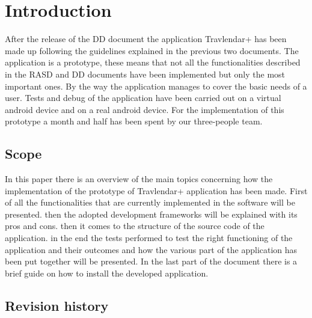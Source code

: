 \chapter{Introduction}
After the release of the DD document the application Travlendar+ has been made up following the guidelines explained in the previous two documents. The application is a prototype, these means that not all the functionalities described in the RASD and DD documents have been implemented but only the most important ones. By the way the application manages to cover the basic needs of a user. Tests and debug of the application have been carried out on a virtual android device and on a real android device. For the implementation of this prototype a month and half has been spent by our three-people team.

\section{Scope}
In this paper there is an overview of the main topics concerning how the implementation of the prototype of Travlendar+ application has been made. First of all the functionalities that are currently implemented in the software will be presented. then the adopted development frameworks  will be explained with its pros and cons. then it comes to the structure of the source code of the application. in the end the tests performed to test the right functioning of the application and their outcomes and how the various part of the application has been put together will be presented. In the last part of the document there is a brief guide on how to install the developed application.

\section{Revision history}